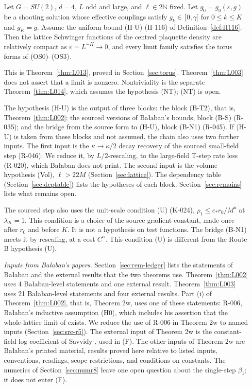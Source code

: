 \begin{mainthm}\label{thm:L003}
Let $G=SU(2)$, $d=4$, $L$ odd and large, and $\ell\in2\mathbb N$ fixed. Let $g_0=g_0(\varepsilon,g)$ be a shooting solution whose effective couplings satisfy $g_k\in\,]0,\gamma]$ for $0\le k\le K$ and $g_K=g$. Assume the uniform bound (H-U) (H-116) of Definition~\ref{def:H116}. Then the lattice Schwinger functions of the centred plaquette density are relatively compact as $\varepsilon=L^{-K}\to0$, and every limit family satisfies the torus forms of (OS0)--(OS3).
\end{mainthm}
This is Theorem~\ref{thm:L013}, proved in Section~\ref{sec:torus}. Theorem~\ref{thm:L003} does not assert that a limit is nonzero. Nontriviality is the separate Theorem~\ref{thm:L014}, which assumes the hypothesis (NT); (NT) is open.

The hypothesis (H-U) is the output of three blocks: the block (B-T2), that is, Theorem~\ref{thm:L002}; the sourced versions of Ba{\l}aban's bounds, block (B-S) (R-035); and the bridge from the source form to (H-U), block (B-N1) (R-045). If (H-U) is taken from these blocks and not assumed, the chain also uses two further inputs. The first input is the $\kappa\to\kappa/2$ decay recovery of the sourced small-field step (R-046). We reduce it, by $L/2$-rescaling, to the large-field T-step rate loss (R-020), which Ba{\l}aban does not print. The second input is the volume hypothesis (Vol), $\ell>22M$ (Section~\ref{sec:lattice}). The dependency table (Section~\ref{sec:deptable}) lists the hypotheses of each block. Section~\ref{sec:remains} lists what remains open.

The sourced step also uses the unit-scale condition (U) (K-024), $\rho_1\le c_*r_0/M^a$ at $\lambda_K=1$. This condition is a choice of the source-gradient constant, made once after $r_0$ and before $K$. It is not a hypothesis on test functions. The bridge (B-N1) meets it by rescaling, at a cost $C^n$. This condition (U) is different from the Route B hypothesis (U).

\emph{Inputs from Ba{\l}aban's papers.} Section~\ref{sec:rem-ledger} lists the statements of Ba{\l}aban and the external results that the two theorems use. Theorem~\ref{thm:L002} uses 4 Ba{\l}aban-level statements and one external result. Theorem~\ref{thm:L003} uses 21 Ba{\l}aban-level statements and four external results. Part (i) of Theorem~\ref{thm:L002}, that is, Theorem 2w, uses one of these statements: R-006, Ba{\l}aban's inductive assumption (H0), which includes his assertion that the whole-lattice limit of \cite[(1.22)]{balaban109} exists. We reduce the use of R-006 in Theorem 2w to named inputs (Section~\ref{sec:src-r5}). The external input of Theorem 2w is the constant-field log coefficient of Savvidy \cite{Savvidy2019}, used in (F). The other inputs of Theorem 2w are Ba{\l}aban's printed material, results proved here relative to listed inputs, conventions, readings, scope restrictions, and conditions on constants. The numerics of Section~\ref{sec:numr8} leave one open question about the single-step $\beta_1$; it does not enter (F).

